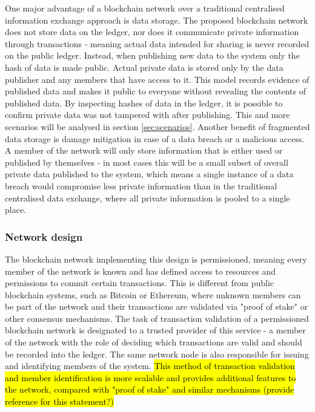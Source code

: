 \documentclass[12pt]{article}
\begin{document}
    One major advantage of a blockchain network over a traditional centralised information exchange approach is data storage. The proposed blockchain network does not store data on the ledger, nor does it communicate private information through transactions - meaning actual data intended for sharing is never recorded on the public ledger. Instead, when publishing new data to the system only the hash of data is made public. Actual private data is stored only by the data publisher and any members that have access to it. This model records evidence of published data and makes it public to everyone without revealing the contents of published data. By inspecting hashes of data in the ledger, it is possible to confirm private data was not tampered with after publishing. This and more scenarios will be analysed in section \ref{sec:scenarios}. Another benefit of fragmented data storage is damage mitigation in case of a data breach or a malicious access. A member of the network will only store information that is either used or published by themselves - in most cases this will be a small subset of overall private data published to the system, which means a single instance of a data breach would compromise less private information than in the traditional centralised data exchange, where all private information is pooled to a single place.

    \subsubsection{Network design}
    The blockchain network implementing this design is permissioned, meaning every member of the network is known and has defined access to resources and permissions to commit certain transactions. This is different from public blockchain systems, such as Bitcoin\cite{bitcoin} or Ethereum\cite{ethereum}, where unknown members can be part of the network and their transactions are validated via "proof of stake" or other consensus mechanisms. The task of transaction validation of a permissioned blockchain network is designated to a trusted provider of this service - a member of the network with the role of deciding which transactions are valid and should be recorded into the ledger. The same network node is also responsible for issuing and identifying members of the system. \hl{This method of transaction validation and member identification is more scalable and provides additional features to the network, compared with "proof of stake" and similar mechanisms (provide reference for this statement?)}
\end{document}
